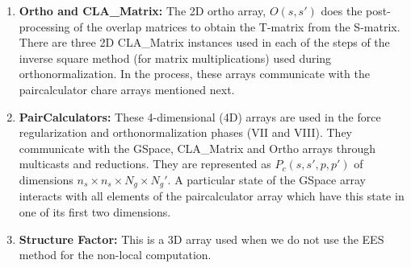 \documentclass[12pt,letter]{article}
\begin{document}
\begin{enumerate}
\item {\bf Ortho and CLA\_Matrix:} The 2D ortho array, $O(s, s')$ does the 
post-processing of the overlap matrices to obtain the T-matrix from the 
S-matrix. There are three 2D CLA\_Matrix instances used in each of the steps of
the inverse square method (for matrix multiplications) used during 
orthonormalization. In the process, these arrays 
communicate with the paircalculator chare arrays mentioned next. 

\item {\bf PairCalculators:} These 4-dimensional (4D) arrays are used in the 
force regularization and orthonormalization phases (VII and VIII). They 
communicate with the GSpace, CLA\_Matrix and Ortho arrays through multicasts and
reductions. They are represented as $P_c(s, s', p, p')$ of dimensions $n_s 
\times n_s \times N_g \times N_{g}'$. A particular state of the GSpace array 
interacts with all elements of the paircalculator array which have this state in
one of its first two dimensions.

\item {\bf Structure Factor:} This is a 3D array used when we do not use the 
EES method for the non-local computation.
\end{enumerate}



\end{document}
